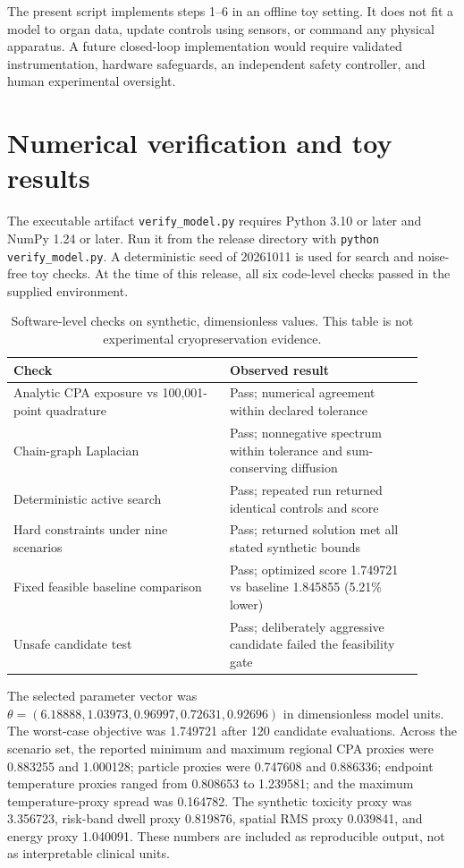 \documentclass[11pt]{article}
\begin{document}
The present script implements steps 1--6 in an offline toy setting. It does not fit a model to organ data, update controls using sensors, or command any physical apparatus. A future closed-loop implementation would require validated instrumentation, hardware safeguards, an independent safety controller, and human experimental oversight.

\section{Numerical verification and toy results}

The executable artifact \texttt{verify\_model.py} requires Python 3.10 or later and NumPy 1.24 or later. Run it from the release directory with \texttt{python verify\_model.py}. A deterministic seed of 20261011 is used for search and noise-free toy checks. At the time of this release, all six code-level checks passed in the supplied environment.

\begin{table}[htbp]
\centering
\small
\begin{tabular}{p{0.48\linewidth}p{0.43\linewidth}}
\toprule
Check & Observed result \\
\midrule
Analytic CPA exposure vs 100,001-point quadrature & Pass; numerical agreement within declared tolerance \\
Chain-graph Laplacian & Pass; nonnegative spectrum within tolerance and sum-conserving diffusion \\
Deterministic active search & Pass; repeated run returned identical controls and score \\
Hard constraints under nine scenarios & Pass; returned solution met all stated synthetic bounds \\
Fixed feasible baseline comparison & Pass; optimized score 1.749721 vs baseline 1.845855 (5.21\% lower) \\
Unsafe candidate test & Pass; deliberately aggressive candidate failed the feasibility gate \\
\bottomrule
\end{tabular}
\caption{Software-level checks on synthetic, dimensionless values. This table is not experimental cryopreservation evidence.}
\label{tab:checks}
\end{table}

The selected parameter vector was $\theta=(6.18888,1.03973,0.96997,0.72631,0.92696)$ in dimensionless model units. The worst-case objective was 1.749721 after 120 candidate evaluations. Across the scenario set, the reported minimum and maximum regional CPA proxies were 0.883255 and 1.000128; particle proxies were 0.747608 and 0.886336; endpoint temperature proxies ranged from 0.808653 to 1.239581; and the maximum temperature-proxy spread was 0.164782. The synthetic toxicity proxy was 3.356723, risk-band dwell proxy 0.819876, spatial RMS proxy 0.039841, and energy proxy 1.040091. These numbers are included as reproducible output, not as interpretable clinical units.
\end{document}
